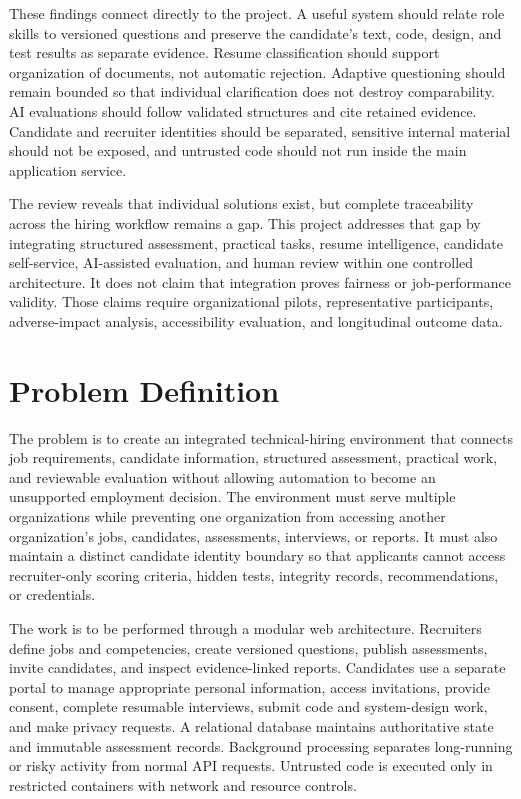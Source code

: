 \documentclass[12pt,a4paper,oneside]{report}
\begin{document}
These findings connect directly to the project. A useful system should relate role
skills to versioned questions and preserve the candidate's text, code, design, and test
results as separate evidence. Resume classification should support organization of
documents, not automatic rejection. Adaptive questioning should remain bounded so
that individual clarification does not destroy comparability. AI evaluations should
follow validated structures and cite retained evidence. Candidate and recruiter
identities should be separated, sensitive internal material should not be exposed, and
untrusted code should not run inside the main application service.

The review reveals that individual solutions exist, but complete traceability across
the hiring workflow remains a gap. This project addresses that gap by integrating
structured assessment, practical tasks, resume intelligence, candidate self-service,
AI-assisted evaluation, and human review within one controlled architecture. It does
not claim that integration proves fairness or job-performance validity. Those claims
require organizational pilots, representative participants, adverse-impact analysis,
accessibility evaluation, and longitudinal outcome data.

\clearpage
\section{Problem Definition}

The problem is to create an integrated technical-hiring environment that connects job
requirements, candidate information, structured assessment, practical work, and
reviewable evaluation without allowing automation to become an unsupported employment
decision. The environment must serve multiple organizations while preventing one
organization from accessing another organization's jobs, candidates, assessments,
interviews, or reports. It must also maintain a distinct candidate identity boundary
so that applicants cannot access recruiter-only scoring criteria, hidden tests,
integrity records, recommendations, or credentials.

The work is to be performed through a modular web architecture. Recruiters define jobs
and competencies, create versioned questions, publish assessments, invite candidates,
and inspect evidence-linked reports. Candidates use a separate portal to manage
appropriate personal information, access invitations, provide consent, complete
resumable interviews, submit code and system-design work, and make privacy requests.
A relational database maintains authoritative state and immutable assessment records.
Background processing separates long-running or risky activity from normal API
requests. Untrusted code is executed only in restricted containers with network and
resource controls.
\end{document}
